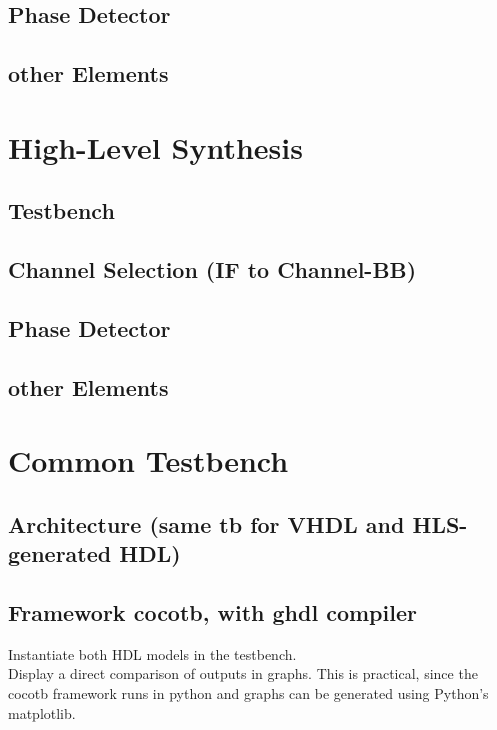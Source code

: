   \subsection{Phase Detector}
  \subsection{other Elements}

  \section{High-Level Synthesis}
  \subsection{Testbench}
  \subsection{Channel Selection (IF to Channel-BB)}
  \subsection{Phase Detector}
  \subsection{other Elements}

\section{Common Testbench}
  \subsection{Architecture (same tb for VHDL and HLS-generated HDL)}
  \subsection{Framework cocotb, with ghdl compiler}
  Instantiate both HDL models in the testbench.\\
  Display a direct comparison of outputs in graphs. This is practical, since the cocotb framework runs in python and graphs can be generated using Python's matplotlib.

